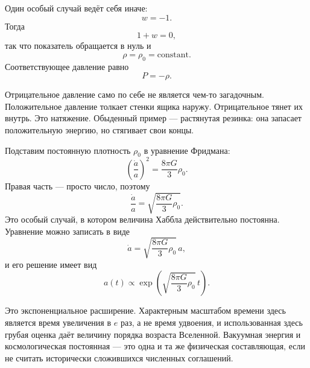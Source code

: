 Один особый случай ведёт себя иначе:
\begin{equation}
w=-1.
\end{equation}
Тогда
\begin{equation}
1+w=0,
\end{equation}
так что показатель обращается в нуль и
\begin{equation}
\rho=\rho_0=\text{constant}.
\end{equation}
Соответствующее давление равно
\begin{equation}
P=-\rho .
\end{equation}

Отрицательное давление само по себе не является чем-то загадочным. Положительное давление толкает стенки ящика наружу. Отрицательное тянет их внутрь. Это натяжение. Обыденный пример — растянутая резинка: она запасает положительную энергию, но стягивает свои концы.

Подставим постоянную плотность \(\rho_0\) в уравнение Фридмана:
\begin{equation}
\left(\frac{\dot a}{a}\right)^2=\frac{8\pi G}{3}\rho_0.
\end{equation}
Правая часть — просто число, поэтому
\begin{equation}
\frac{\dot a}{a}=\sqrt{\frac{8\pi G}{3}\rho_0}.
\end{equation}
Это особый случай, в котором величина Хаббла действительно постоянна. Уравнение можно записать в виде
\begin{equation}
\dot a=\sqrt{\frac{8\pi G}{3}\rho_0}\,a,
\end{equation}
и его решение имеет вид
\begin{equation}
a(t)\propto \exp\!\left(\sqrt{\frac{8\pi G}{3}\rho_0}\,t\right).
\end{equation}

Это экспоненциальное расширение. Характерным масштабом времени здесь является время увеличения в \(e\) раз, а не время удвоения, и использованная здесь грубая оценка даёт величину порядка возраста Вселенной. Вакуумная энергия и космологическая постоянная — это одна и та же физическая составляющая, если не считать исторически сложившихся численных соглашений.

\begin{classroomqa}
\end{classroomqa}

